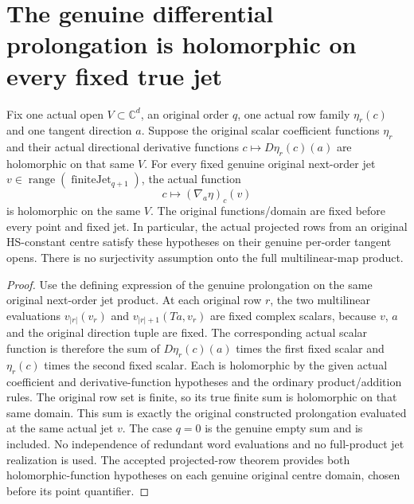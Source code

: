 \section{The genuine differential prolongation is holomorphic on every fixed true jet}

\begin{theorem}
\label{hir:actual-dual-jet-prolongation-holomorphic-fixed-true-jet}
\leanok
Fix one actual open $V\subset\mathbb C^d$, an original order $q$,
one actual row family $\eta_r(c)$ and one tangent direction $a$.
Suppose the original scalar coefficient functions $\eta_r$ and their
actual directional derivative functions
$c\mapsto D\eta_r(c)(a)$ are holomorphic on that same $V$.
For every fixed genuine original next-order jet
$v\in\operatorname{range}(\operatorname{finiteJet}_{q+1})$,
the actual function
\[
 c\longmapsto(\nabla_a\eta)_c(v)
\]
is holomorphic on the same $V$. The original functions/domain are
fixed before every point and fixed jet. In particular, the actual
projected rows from an original HS-constant centre satisfy these
hypotheses on their genuine per-order tangent opens. There is no
surjectivity assumption onto the full multilinear-map product.
\end{theorem}
\begin{proof}
Use the defining expression of the genuine prolongation on the same
original next-order jet product. At each original row $r$, the two
multilinear evaluations
$v_{|r|}(v_r)$ and $v_{|r|+1}(Ta,v_r)$ are fixed complex scalars,
because $v$, $a$ and the original direction tuple are fixed.
The corresponding actual scalar function is therefore the sum of
$D\eta_r(c)(a)$ times the first fixed scalar and $\eta_r(c)$ times
the second fixed scalar. Each is holomorphic by the given actual
coefficient and derivative-function hypotheses and the ordinary
product/addition rules. The original row set is finite, so its true
finite sum is holomorphic on that same domain. This sum is exactly
the original constructed prolongation evaluated at the same actual
jet $v$. The case $q=0$ is the genuine empty sum and is included.
No independence of redundant word evaluations and no full-product
jet realization is used. The accepted projected-row theorem provides
both holomorphic-function hypotheses on each genuine original
centre domain, chosen before its point quantifier.
\end{proof}
